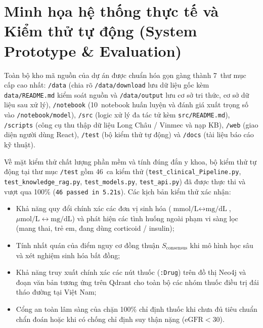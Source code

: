 \section{Minh họa hệ thống thực tế và Kiểm thử tự động (System Prototype \& Evaluation)}
\label{sec:system-demo}

Toàn bộ kho mã nguồn của dự án được chuẩn hóa gọn gàng thành 7~thư mục cấp cao nhất: \texttt{/data} (chia rõ \texttt{/data/download} lưu dữ liệu gốc kèm \texttt{data/README.md} kiểm soát nguồn và \texttt{/data/output} lưu cơ sở tri thức, cơ sở dữ liệu sau xử lý), \texttt{/notebook} (10~notebook huấn luyện và đánh giá xuất trọng số vào \texttt{/notebook/model}), \texttt{/src} (logic xử lý đa tác tử kèm \texttt{src/README.md}), \texttt{/scripts} (công cụ thu thập dữ liệu Long Châu / Vinmec và nạp KB), \texttt{/web} (giao diện người dùng React), \texttt{/test} (bộ kiểm thử tự động) và \texttt{/docs} (tài liệu báo cáo kỹ thuật).


Về mặt kiểm thử chất lượng phần mềm và tính đúng đắn y khoa, bộ kiểm thử tự động tại thư mục \texttt{/test} gồm 46~ca kiểm thử (\texttt{test\_clinical\_Pipeline.py}, \texttt{test\_knowledge\_rag.py}, \texttt{test\_models.py}, \texttt{test\_api.py}) đã được thực thi và vượt qua 100\% (\texttt{46 passed in 5.21s}). Các kịch bản kiểm thử xác nhận:
\begin{itemize}
  \item Khả năng quy đổi chính xác các đơn vị sinh hóa ($\text{mmol/L} \leftrightarrow \text{mg/dL}$, $\mu\text{mol/L} \leftrightarrow \text{mg/dL}$) và phát hiện các tình huống ngoài phạm vi sàng lọc (mang thai, trẻ em, đang dùng corticoid / insulin);
  \item Tính nhất quán của điểm nguy cơ đồng thuận $S_{\text{consensus}}$ khi mô hình học sâu và xét nghiệm sinh hóa bất đồng;
  \item Khả năng truy xuất chính xác các nút thuốc (\texttt{:Drug}) trên đồ thị Neo4j và đoạn văn bản tương ứng trên Qdrant cho toàn bộ các nhóm thuốc điều trị đái tháo đường tại Việt Nam;
  \item Cổng an toàn lâm sàng của  chặn 100\% chỉ định thuốc khi chưa đủ tiêu chuẩn chẩn đoán hoặc khi có chống chỉ định suy thận nặng ($\text{eGFR} < 30$).
\end{itemize}
